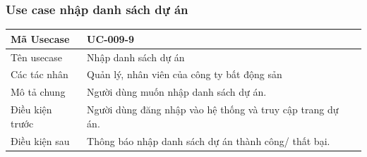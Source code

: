 \documentclass[12pt,a4paper]{article}
\begin{document}
    \subsubsection*{Use case nhập danh sách dự án}
    \begin{table}[H]
        \centering
        \begin{tabular}{|p{3.5cm}|p{11.5cm}|c|}
            \hline
            Mã Usecase      & UC-009-9                                                   \\
            \hline
            Tên usecase     & Nhập danh sách dự án                                       \\
            \hline
            Các tác nhân    & Quản lý, nhân viên của công ty bất động sản                \\
            \hline
            Mô tả chung     & Người dùng muốn nhập danh sách dự án.                      \\
            \hline

            Điều kiện trước & Người dùng đăng nhập vào hệ thống và truy cập trang dự án. \\
            \hline

            Điều kiện sau   & Thông báo nhập danh sách dự án thành công/ thất bại.       \\
            \hline


\end{tabular}
\end{table}
\end{document}
